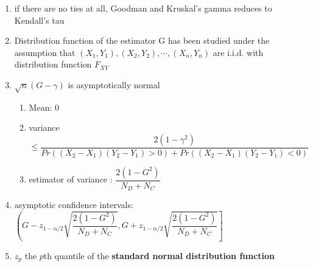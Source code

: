 \begin{enumerate}
    \item if there are no ties at all, Goodman and Kruskal’s gamma reduces to Kendall’s tau

    \item Distribution function of the estimator G has been studied under the assumption that $(X_1, Y_1), (X_2, Y_2), \cdots , (X_n, Y_n)$ are i.i.d. with distribution function $F_{XY}$

    \item $\sqrt{n}(G - \gamma)$ is asymptotically normal
    \begin{enumerate}
        \item Mean: $0$

        \item variance $
            \leq
            \dfrac{2(1 - \gamma^2)}{
                Pr((X_2 - X_1)(Y_2 - Y_1) > 0) + Pr((X_2 - X_1)(Y_2 - Y_1) < 0)
            }
        $

        \item estimator of variance	: $\dfrac{2(1 - G^2)}{N_D + N_C}$
    \end{enumerate}

    \item asymptotic confidence intervals:
    $
        \left(
            G - z_{1-\alpha/2}\sqrt{
                \dfrac{2(1-G^2)}{N_D+N_C}
            },
            G + z_{1-\alpha/2}\sqrt{
                \dfrac{2(1-G^2)}{N_D+N_C}
            }
        \right]
    $

    \item $z_p$ the $p$th quantile of the \textbf{standard normal distribution function}
\end{enumerate}









































